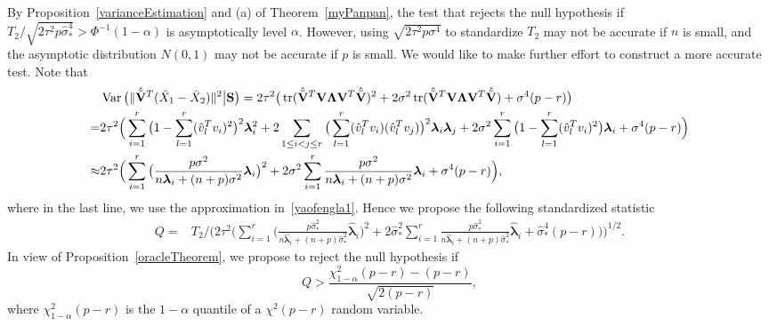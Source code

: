 \documentclass[3p]{elsarticle}
\DeclareMathOperator{\mytr}{tr}
\DeclareMathOperator{\myVar}{Var}
\newcommand{\bfsym}[1]{\ensuremath{\boldsymbol{#1}}}
\def\blambda {\bfsym {\lambda}}        \def\bLambda {\bfsym {\Lambda}}
\theoremstyle{plain}
\theoremstyle{definition}
\theoremstyle{remark}
\begin{document}
By Proposition~\ref{varianceEstimation} and (a) of Theorem~\ref{myPanpan}, the test that rejects the null hypothesis if
$
T_2/\sqrt{2\tau^2 p\hat{\sigma}^4_*}>\Phi^{-1}(1-\alpha)
$
is asymptotically level $\alpha$.
However, using $\sqrt{2\tau^2 p\sigma^4}$ to standardize $T_2$ may not be accurate if $n$ is small, and the asymptotic distribution $N(0,1)$ may not be accurate if $p$ is small.
We would like to make further effort to construct a more accurate test.
Note that
$$
\begin{aligned}
    &\myVar\big(
\|\hat{\tilde{\BV}}^T (\bar{X}_1-\bar{X}_2)\|^2
\big| \BS
\big)
    =2\tau^2\big(
\mytr(\hat{\tilde{\BV}}^T \BV \bLambda \BV^T\hat{\tilde{\BV}})^2
+
2\sigma^2\mytr(\hat{\tilde{\BV}}^T \BV \bLambda \BV^T\hat{\tilde{\BV}})
+\sigma^4 (p-r)
\big)
\\
    =&
    2\tau^2\Big(
    \sum_{i=1}^r \big(1-\sum_{l=1}^r (\hat{v}_l^T v_i)^2\big)^2 \blambda_i^2
    +2\sum_{1\leq i<j \leq r}\big(\sum_{l=1}^r (\hat{v}_l^T v_i)(\hat{v}_l^T v_j )\big)^2\blambda_i\blambda_j
    +
    2\sigma^2\sum_{i=1}^r \big(1-\sum_{l=1}^r (\hat{v}_l^T v_i)^2\big) \blambda_i
    +\sigma^4 (p-r)
    \Big)
    \\
    \approx&
    2\tau^2\Big(
    \sum_{i=1}^r \big(\frac{p\sigma^2}{n\blambda_i+(n+p)\sigma^2}\blambda_i\big)^2
    +
    2\sigma^2\sum_{i=1}^r \frac{p\sigma^2}{n\blambda_i+(n+p)\sigma^2}\blambda_i
    +\sigma^4 (p-r)
    \Big),
\end{aligned}
$$
where in the last line, we use the approximation in~\eqref{yaofengla1}.
Hence we propose the following standardized statistic
$$
    \begin{aligned}
        Q=&T_2/
   \Bigg( 
        2\tau^2\Big(
        \sum_{i=1}^r \big(\frac{p\hat{\sigma}_*^2}{n\hat{\blambda}_i+(n+p)\hat{\sigma}_*^2}\hat{\blambda}_i\big)^2
    +
        2\hat{\sigma}_*^2\sum_{i=1}^r \frac{p\hat{\sigma}_*^2}{n\hat{\blambda}_i+(n+p)\hat{\sigma}_*^2}\hat{\blambda}_i
        +\hat{\sigma}_*^4 (p-r)
    \Big)\Bigg)^{1/2}.
    \end{aligned}
$$
In view of Proposition~\ref{oracleTheorem}, we propose to reject the null hypothesis if
$$
        Q>\frac{\chi^2_{1-\alpha}(p-r)-(p-r)}{\sqrt{2(p-r)}},
$$
where $\chi^2_{1-\alpha} (p-r)$ is the $1-\alpha$ quantile of a $\chi^2(p-r)$ random variable.
\end{document}
